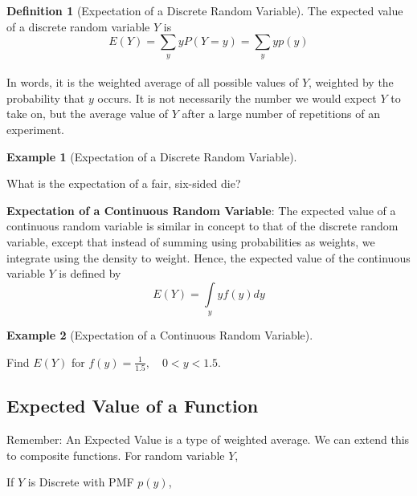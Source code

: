 \documentclass[
]{book}
\theoremstyle{definition}
\newtheorem{definition}{Definition}[chapter]
\theoremstyle{definition}
\newtheorem{example}{Example}[chapter]
\theoremstyle{definition}
\theoremstyle{remark}
\begin{document}
\begin{definition}[Expectation of a Discrete Random Variable]
\protect\hypertarget{def:unnamed-chunk-83}{}{\label{def:unnamed-chunk-83} {} }The expected value of a discrete random variable \(Y\) is \[E(Y)=\sum\limits_{y} y P(Y=y)= \sum\limits_{y} y p(y)\]\\
In words, it is the weighted average of all possible values of \(Y\), weighted by the probability that \(y\) occurs. It is not necessarily the number we would expect \(Y\) to take on, but the average value of \(Y\) after a large number of repetitions of an experiment.
\end{definition}

\begin{example}[Expectation of a Discrete Random Variable]
\protect\hypertarget{exm:expectdiscrete}{}{\label{exm:expectdiscrete} {} }

What is the expectation of a fair, six-sided die?
\end{example}

\textbf{Expectation of a Continuous Random Variable}: The expected
value of a continuous random variable is similar in concept to that of
the discrete random variable, except that instead of summing using
probabilities as weights, we integrate using the density to weight.
Hence, the expected value of the continuous variable \(Y\) is defined by
\[E(Y)=\int\limits_{y} y f(y) dy\]

\begin{example}[Expectation of a Continuous Random Variable]
\protect\hypertarget{exm:expectconti}{}{\label{exm:expectconti} {} }

Find \(E(Y)\) for \(f(y)=\frac{1}{1.5}, \quad 0<y<1.5\).
\end{example}

\hypertarget{expected-value-of-a-function}{%
\subsection*{Expected Value of a Function}\label{expected-value-of-a-function}}

Remember: An Expected Value is a type of weighted average. We can extend this to composite functions. For random variable \(Y\),

If \(Y\) is Discrete with PMF \(p(y)\),
\end{document}

